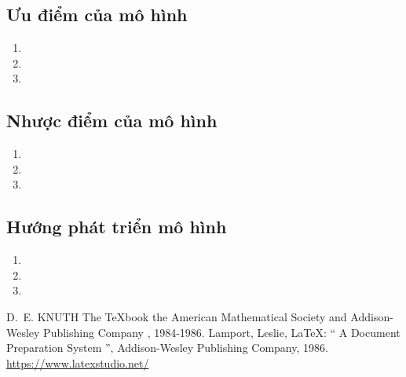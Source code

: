 \subsection{Ưu điểm của mô hình}
\lipsum[4][1-7]

\begin{enumerate}
    \item \lipsum[4][1-3]

    \item \lipsum[4][1-3]

    \item \lipsum[4][1-3]
\end{enumerate}

\subsection{Nhược điểm của mô hình}
\lipsum[4][1-7]

\begin{enumerate}
    \item \lipsum[4][1-3]

    \item \lipsum[4][1-3]

    \item \lipsum[4][1-3]
\end{enumerate}
\subsection{Hướng phát triển mô hình}
\lipsum[4][1-7]

\begin{enumerate}
    \item \lipsum[4][1-3]

    \item \lipsum[4][1-3]

    \item \lipsum[4][1-3]
\end{enumerate}

\newpage
\thispagestyle{empty}
\begin{thebibliography}{99}
 D.~E. KNUTH   The \TeX{}book  the American
Mathematical Society and Addison-Wesley
Publishing Company , 1984-1986.
Lamport, Leslie,  \LaTeX{}: `` A Document Preparation System '',
Addison-Wesley Publishing Company, 1986.
\url{https://www.latexstudio.net/}
\end{thebibliography}
\newpage

